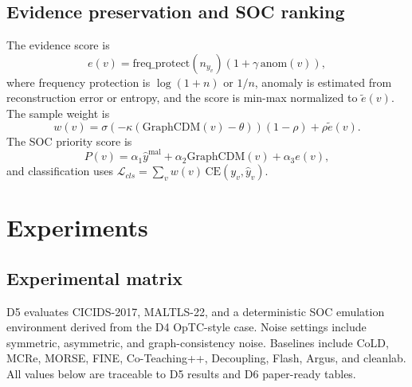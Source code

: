 \documentclass[preprint,12pt]{elsarticle}
\newcommand{\gcdm}{\mathrm{GraphCDM}}
\newcommand{\ypred}{\hat{y}}
\newcommand{\mal}{\mathrm{mal}}
\begin{document}
\subsection{Evidence preservation and SOC ranking}
The evidence score is
\begin{equation}
e(v)=\mathrm{freq\_protect}(n_{y_v})(1+\gamma\,\mathrm{anom}(v)),
\end{equation}
where frequency protection is $\log(1+n)$ or $1/n$, anomaly is estimated from reconstruction error or entropy, and the score is min-max normalized to $\tilde{e}(v)$. The sample weight is
\begin{equation}
w(v)=\sigma(-\kappa(\gcdm(v)-\theta))(1-\rho)+\rho\tilde{e}(v).
\end{equation}
The SOC priority score is
\begin{equation}
P(v)=\alpha_1\ypred^\mal+\alpha_2\gcdm(v)+\alpha_3e(v),
\end{equation}
and classification uses $\mathcal{L}_{cls}=\sum_v w(v)\,\mathrm{CE}(y_v,\ypred_v)$.

\section{Experiments}
\subsection{Experimental matrix}
D5 evaluates CICIDS-2017, MALTLS-22, and a deterministic SOC emulation environment derived from the D4 OpTC-style case. Noise settings include symmetric, asymmetric, and graph-consistency noise. Baselines include CoLD, MCRe, MORSE, FINE, Co-Teaching++, Decoupling, Flash, Argus, and cleanlab. All values below are traceable to D5 results and D6 paper-ready tables.
\end{document}
